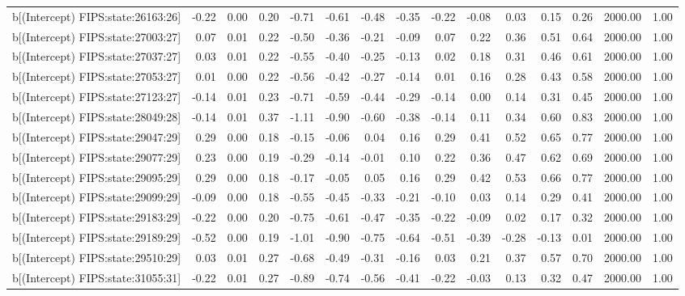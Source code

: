 \begin{table}[ht]
\begin{tabular}{rrrrrrrrrrrrrrr}
  b[(Intercept) FIPS:state:26163:26] & -0.22 & 0.00 & 0.20 & -0.71 & -0.61 & -0.48 & -0.35 & -0.22 & -0.08 & 0.03 & 0.15 & 0.26 & 2000.00 & 1.00 \\ 
  b[(Intercept) FIPS:state:27003:27] & 0.07 & 0.01 & 0.22 & -0.50 & -0.36 & -0.21 & -0.09 & 0.07 & 0.22 & 0.36 & 0.51 & 0.64 & 2000.00 & 1.00 \\ 
  b[(Intercept) FIPS:state:27037:27] & 0.03 & 0.01 & 0.22 & -0.55 & -0.40 & -0.25 & -0.13 & 0.02 & 0.18 & 0.31 & 0.46 & 0.61 & 2000.00 & 1.00 \\ 
  b[(Intercept) FIPS:state:27053:27] & 0.01 & 0.00 & 0.22 & -0.56 & -0.42 & -0.27 & -0.14 & 0.01 & 0.16 & 0.28 & 0.43 & 0.58 & 2000.00 & 1.00 \\ 
  b[(Intercept) FIPS:state:27123:27] & -0.14 & 0.01 & 0.23 & -0.71 & -0.59 & -0.44 & -0.29 & -0.14 & 0.00 & 0.14 & 0.31 & 0.45 & 2000.00 & 1.00 \\ 
  b[(Intercept) FIPS:state:28049:28] & -0.14 & 0.01 & 0.37 & -1.11 & -0.90 & -0.60 & -0.38 & -0.14 & 0.11 & 0.34 & 0.60 & 0.83 & 2000.00 & 1.00 \\ 
  b[(Intercept) FIPS:state:29047:29] & 0.29 & 0.00 & 0.18 & -0.15 & -0.06 & 0.04 & 0.16 & 0.29 & 0.41 & 0.52 & 0.65 & 0.77 & 2000.00 & 1.00 \\ 
  b[(Intercept) FIPS:state:29077:29] & 0.23 & 0.00 & 0.19 & -0.29 & -0.14 & -0.01 & 0.10 & 0.22 & 0.36 & 0.47 & 0.62 & 0.69 & 2000.00 & 1.00 \\ 
  b[(Intercept) FIPS:state:29095:29] & 0.29 & 0.00 & 0.18 & -0.17 & -0.05 & 0.05 & 0.16 & 0.29 & 0.42 & 0.53 & 0.66 & 0.77 & 2000.00 & 1.00 \\ 
  b[(Intercept) FIPS:state:29099:29] & -0.09 & 0.00 & 0.18 & -0.55 & -0.45 & -0.33 & -0.21 & -0.10 & 0.03 & 0.14 & 0.29 & 0.41 & 2000.00 & 1.00 \\ 
  b[(Intercept) FIPS:state:29183:29] & -0.22 & 0.00 & 0.20 & -0.75 & -0.61 & -0.47 & -0.35 & -0.22 & -0.09 & 0.02 & 0.17 & 0.32 & 2000.00 & 1.00 \\ 
  b[(Intercept) FIPS:state:29189:29] & -0.52 & 0.00 & 0.19 & -1.01 & -0.90 & -0.75 & -0.64 & -0.51 & -0.39 & -0.28 & -0.13 & 0.01 & 2000.00 & 1.00 \\ 
  b[(Intercept) FIPS:state:29510:29] & 0.03 & 0.01 & 0.27 & -0.68 & -0.49 & -0.31 & -0.16 & 0.03 & 0.21 & 0.37 & 0.57 & 0.70 & 2000.00 & 1.00 \\ 
  b[(Intercept) FIPS:state:31055:31] & -0.22 & 0.01 & 0.27 & -0.89 & -0.74 & -0.56 & -0.41 & -0.22 & -0.03 & 0.13 & 0.32 & 0.47 & 2000.00 & 1.00 \\ 

\end{tabular}
\end{table}
